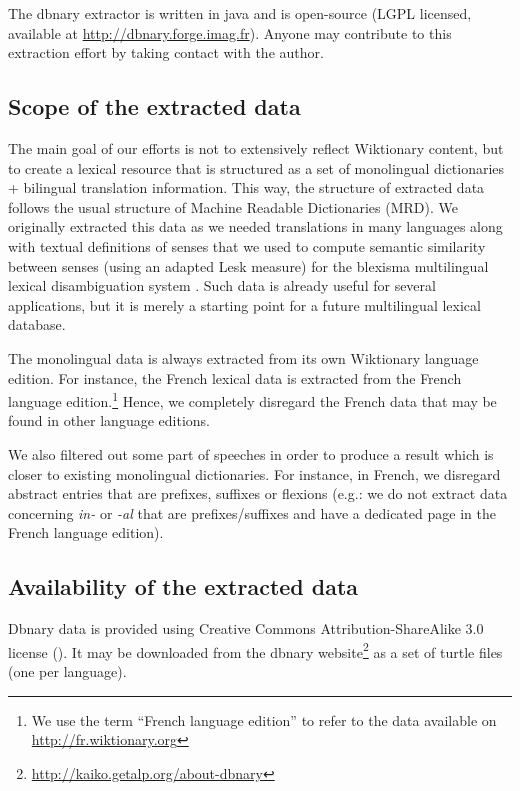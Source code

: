 \documentclass[sw]{iosart2c}
\begin{document}
The dbnary extractor is written in java and is open-source (LGPL licensed, available at \url{http://dbnary.forge.imag.fr}). Anyone may contribute to this extraction effort by taking contact with the author.

\subsection{Scope of the extracted data}

The main goal of our efforts is not to extensively reflect Wiktionary content, but to create a lexical resource that is structured as a set of monolingual dictionaries + bilingual translation information. This way, the structure of extracted data follows the usual structure of Machine Readable Dictionaries (MRD). We originally extracted this data as we needed translations in many languages along with textual definitions of senses that we used to compute semantic similarity between senses (using an adapted Lesk measure) for the blexisma multilingual lexical disambiguation system \cite{schwab2012coling}. Such data is already useful for several applications, but it is merely a starting point for a future multilingual lexical database.

The monolingual data is always extracted from its own Wiktionary language edition. For instance, the French lexical data is extracted from the French language edition.\footnote{We use the term ``French language edition'' to refer to the data available on \url{http://fr.wiktionary.org}} Hence, we completely disregard the French data that may be found in other language editions.

We also filtered out some part of speeches in order to produce a result which is closer to existing monolingual dictionaries. For instance, in French, we disregard abstract entries that are prefixes, suffixes or flexions (e.g.: we do not extract data concerning \textit{in-} or \textit{-al} that are prefixes/suffixes and have a dedicated page in the French language edition).

\subsection{Availability of the extracted data}

Dbnary data is provided using Creative Commons Attribution-ShareAlike 3.0 license (\ccbysa). It may be downloaded from the dbnary website\footnote{\url{http://kaiko.getalp.org/about-dbnary}} as a set of turtle files (one per language).
\end{document}
